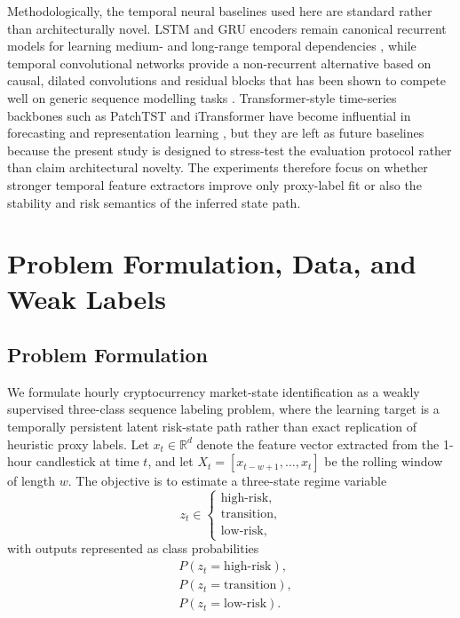 \documentclass[a4paper,fleqn]{cas-dc}
\begin{document}
Methodologically, the temporal neural baselines used here are standard rather than architecturally novel. LSTM and GRU encoders remain canonical recurrent models for learning medium- and long-range temporal dependencies \cite{hochreiter1997lstm,cho2014gru}, while temporal convolutional networks provide a non-recurrent alternative based on causal, dilated convolutions and residual blocks that has been shown to compete well on generic sequence modelling tasks \cite{bai2018tcn}. Transformer-style time-series backbones such as PatchTST and iTransformer have become influential in forecasting and representation learning \cite{nie2023patchtst,liu2024itransformer}, but they are left as future baselines because the present study is designed to stress-test the evaluation protocol rather than claim architectural novelty. The experiments therefore focus on whether stronger temporal feature extractors improve only proxy-label fit or also the stability and risk semantics of the inferred state path.

\section{Problem Formulation, Data, and Weak Labels}
\subsection{Problem Formulation}
We formulate hourly cryptocurrency market-state identification as a weakly supervised three-class sequence labeling problem, where the learning target is a temporally persistent latent risk-state path rather than exact replication of heuristic proxy labels. Let $x_t \in \mathbb{R}^{d}$ denote the feature vector extracted from the 1-hour candlestick at time $t$, and let $X_t = [x_{t-w+1}, \dots, x_t]$ be the rolling window of length $w$. The objective is to estimate a three-state regime variable
\begin{equation*}
z_t \in
\begin{cases}
\text{high-risk},\\
\text{transition},\\
\text{low-risk},
\end{cases}
\end{equation*}
with outputs represented as class probabilities
\begin{align*}
&P(z_t=\text{high-risk}),\\
&P(z_t=\text{transition}),\\
&P(z_t=\text{low-risk}).
\end{align*}
\end{document}
